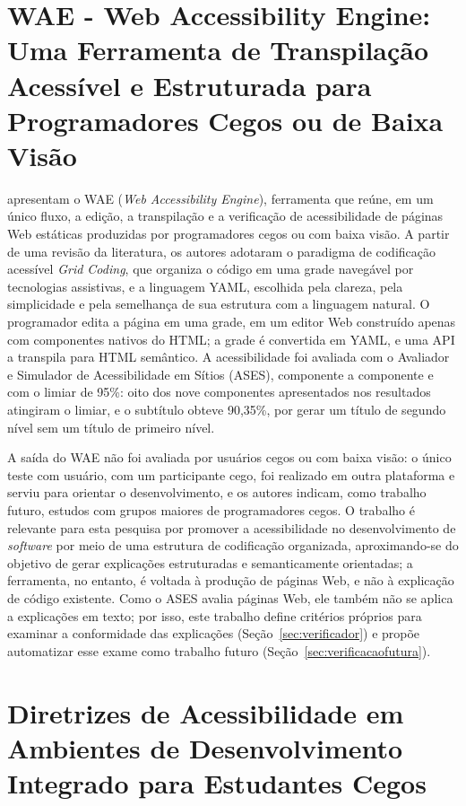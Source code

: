 \documentclass[
    12pt,                   %
    openright,              %
    oneside,                %
    a4paper,                %
    sumario=tradicional,    %
    english,                %
    brazil,                 %
    ]{abntex2}
\begin{document}
\section{WAE - Web Accessibility Engine: Uma Ferramenta de Transpilação Acessível e Estruturada para Programadores Cegos ou de Baixa Visão}

\textcite{latinoware40920} apresentam o WAE (\textit{Web Accessibility Engine}), ferramenta que reúne, em um único fluxo, a edição, a transpilação e a verificação de acessibilidade de páginas Web estáticas produzidas por programadores cegos ou com baixa visão. A partir de uma revisão da literatura, os autores adotaram o paradigma de codificação acessível \textit{Grid Coding}, que organiza o código em uma grade navegável por tecnologias assistivas, e a linguagem YAML, escolhida pela clareza, pela simplicidade e pela semelhança de sua estrutura com a linguagem natural. O programador edita a página em uma grade, em um editor Web construído apenas com componentes nativos do HTML; a grade é convertida em YAML, e uma API a transpila para HTML semântico. A acessibilidade foi avaliada com o Avaliador e Simulador de Acessibilidade em Sítios (ASES), componente a componente e com o limiar de 95\%: oito dos nove componentes apresentados nos resultados atingiram o limiar, e o subtítulo obteve 90,35\%, por gerar um título de segundo nível sem um título de primeiro nível.

A saída do WAE não foi avaliada por usuários cegos ou com baixa visão: o único teste com usuário, com um participante cego, foi realizado em outra plataforma e serviu para orientar o desenvolvimento, e os autores indicam, como trabalho futuro, estudos com grupos maiores de programadores cegos. O trabalho é relevante para esta pesquisa por promover a acessibilidade no desenvolvimento de \textit{software} por meio de uma estrutura de codificação organizada, aproximando-se do objetivo de gerar explicações estruturadas e semanticamente orientadas; a ferramenta, no entanto, é voltada à produção de páginas Web, e não à explicação de código existente. Como o ASES avalia páginas Web, ele também não se aplica a explicações em texto; por isso, este trabalho define critérios próprios para examinar a conformidade das explicações (Seção~\ref{sec:verificador}) e propõe automatizar esse exame como trabalho futuro (Seção~\ref{sec:verificacaofutura}).

\section{Diretrizes de Acessibilidade em Ambientes de Desenvolvimento Integrado para Estudantes Cegos}
\end{document}
